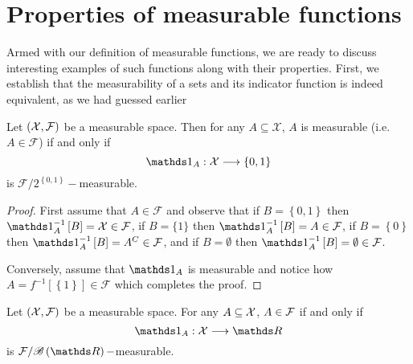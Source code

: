 \section{Properties of measurable functions}

Armed with our definition of measurable functions, we are ready to
discuss interesting examples of such functions along with their properties.
First, we establish that the measurability of a sets and its indicator
function is indeed equivalent, as we had guessed earlier
\begin{prop}
\label{prop:measurableSetsFunctions}Let $\left(\mathcal{X},\mathcal{F}\right)$
be a measurable space. Then for any $A\subseteq\mathcal{X}$, $A$
is measurable (i.e. $A\in\mathcal{F}$) if and only if 
\[
\indicate_{A}:\mathcal{X}\longrightarrow\left\{ 0,1\right\} 
\]
is $\mathcal{F}/2^{\left\{ 0,1\right\} }-$measurable.
\end{prop}

\begin{proof}
First assume that $A\in\mathcal{F}$ and observe that if $B=\left\{ 0,1\right\} $
then $\indicate_{A}^{-1}\left[B\right]=\X\in\mathcal{F}$, if $B=\{1\}$
then $\indicate_{A}^{-1}\left[B\right]=A\in\mathcal{F}$, if $B=\left\{ 0\right\} $
then $\indicate_{A}^{-1}\left[B\right]=A^{C}\in\mathcal{F}$, and
if $B=\emptyset$ then $\indicate_{A}^{-1}\left[B\right]=\emptyset\in\mathcal{F}$.

Conversely, assume that $\indicate_{A}$ is measurable and notice
how $A=f^{-1}\left[\left\{ 1\right\} \right]\in\mathcal{F}$ which
completes the proof.
\end{proof}
\begin{cor}
\label{cor:borelMeasurableSetsFunctions}Let $\left(\mathcal{X},\mathcal{F}\right)$
be a measurable space. For any $A\subseteq\mathcal{X}$, $A\in\mathcal{F}$ if and only
if
\[
\indicate_{A}:\X\longrightarrow\R
\]
is $\F/\borel\left(\R\right)-$measurable.
\end{cor}

